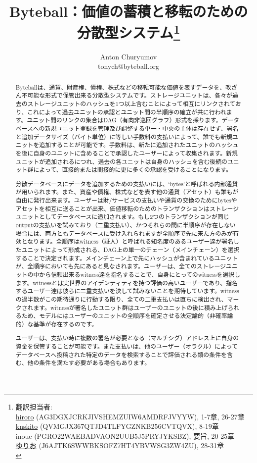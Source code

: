 \documentclass[a4paper, dvipdfmx]{jsarticle}
\title{Byteball：価値の蓄積と移転のための分散型システム\thanks{翻訳担当者: \\
     \href{https://twitter.com/hirorobyte}{hiroro} (AG3DGXJCRKJIVSHEMZUIW6AMDRFJVYYW), 1-7章, 26-27章 \\
     \href{http://knskito.com/}{knskito} (QVMGJX367QTJD4TLFYGZNKB256CVTQVX), 8-19章 \\
     inoue (PGRO22WAEBADVAON2UUB5J5PRYJYKSBZ), 要旨, 20-25章 \\
     \href{https://twitter.com/yurwo}{ゆりお} (J6AJTK6SWWBKSOFZ7HT4YBVWSG3ZW4ZU), 28-31章 \\
     }
}
\author{Anton Churyumov\\tonych@byteball.org}
\date{}
\begin{document}
\maketitle

\begin{abstract}
Byteballは、通貨、財産権、債権、株式などの移転可能な価値を表すデータを、改ざん不可能な形式で保管出来る分散型システムです。ストレージユニットは、各々が過去のストレージユニットのハッシュを1つ以上含むことによって相互にリンクされており、これによって過去ユニットの承認とユニット間の半順序の確立が共に行われます。ユニット間のリンクの集合はDAG（有向非巡回グラフ）形式を採ります。データベースへの新規ユニット登録を管理及び調整する単一・中央の主体は存在せず、署名と追加データサイズ（バイト単位）に等しい手数料の支払いによって、誰でも新規ユニットを追加することが可能です。手数料は、新たに追加されたユニットのハッシュを後に自身のユニットに含めることで承認したユーザーによって収集されます。新規ユニットが追加されるにつれ、過去の各ユニットは自身のハッシュを含む後続のユニット群によって、直接的または間接的に更に多くの承認を受けることになります。

分散データベースにデータを追加するための支払いには、‘bytes’と呼ばれる内部通貨が用いられます。また、資産や債権、株式などを表す他の通貨（アセット）も誰もが自由に発行出来ます。ユーザーは財/サービスの支払いや通貨の交換のためにbytesやアセットを相互に送ることが出来、価値移転のためのトランザクションはストレージユニットとしてデータベースに追加されます。もし2つのトランザクションが同じoutputの支払いを試みており（二重支払い）、かつそれらの間に半順序が存在しない場合には、両方ともデータベースに受け入れられますが全順序で先に来た方のみが有効となります。全順序はwitness（証人）と呼ばれる知名度のあるユーザー達が署名したユニットによって形成される、DAG上の単一のチェーン（メインチェーン）を選択することで決定されます。メインチェーン上で先にハッシュが含まれているユニットが、全順序においても先にあると見なされます。ユーザーは、全てのストレージユニットの中から信頼出来るwitness達を指名することで、自身にとってのwitnessを選択します。witnessとは実世界のアイデンティティを持つ評価の高いユーザーであり、指名するユーザー達は彼らに二重支払いを決して試みないことを期待しています。witnessの過半数がこの期待通りに行動する限り、全ての二重支払いは直ちに検出され、マークされます。witnessが署名したユニット群はユーザーのユニットの後に積み上げられるため、モデルにはユーザーのユニットの全順序を確定させる決定論的（非確率論的）な基準が存在するのです。

ユーザーは、支払い時に複数の署名が必要となる（マルチシグ）アドレス上に自身の資金を保管することが可能です。また支払いは、他のユーザー（オラクル）によってデータベースへ投稿された特定のデータを検索することで評価される類の条件を含む、他の条件を満たす必要がある場合もあります。


\end{abstract}
\end{document}
